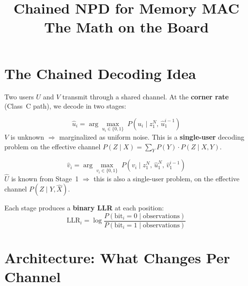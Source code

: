 \documentclass[11pt]{article}
\title{\textbf{Chained NPD for Memory MAC}\\[5pt]
\large The Math on the Board}
\author{}
\date{}
\begin{document}
\maketitle
\thispagestyle{empty}

\section{The Chained Decoding Idea}

Two users $U$ and $V$ transmit through a shared channel. At the \textbf{corner rate} (Class~C path), we decode in two stages:

\begin{tcolorbox}[colback=blue!5,colframe=stageblue,title=Stage 1: Decode $U$ (treat $V$ as noise)]
\[
\hat{u}_i = \arg\max_{u_i \in \{0,1\}} \; P(u_i \mid z_1^N,\, \hat{u}_1^{i-1})
\]
$V$ is unknown $\Rightarrow$ marginalized as uniform noise. This is a \textbf{single-user} decoding problem on the effective channel $P(Z \mid X) = \sum_Y P(Y) \cdot P(Z \mid X, Y)$.
\end{tcolorbox}

\begin{tcolorbox}[colback=green!5,colframe=stagegreen,title=Stage 2: Decode $V$ given $\hat{U}$]
\[
\hat{v}_i = \arg\max_{v_i \in \{0,1\}} \; P(v_i \mid z_1^N,\, \hat{u}_1^N,\, \hat{v}_1^{i-1})
\]
$\hat{U}$ is known from Stage~1 $\Rightarrow$ this is also a single-user problem, on the effective channel $P(Z \mid Y, \hat{X})$.
\end{tcolorbox}

\medskip
Each stage produces a \textbf{binary LLR} at each position:
\[
\text{LLR}_i = \log \frac{P(\text{bit}_i = 0 \mid \text{observations})}{P(\text{bit}_i = 1 \mid \text{observations})}
\]

\section{Architecture: What Changes Per Channel}
\end{document}

